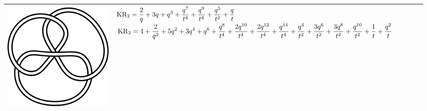 \documentclass{compositio}
\theoremstyle{definition}
\numberwithin{equation}{section}
\begin{document}
{\begin{longtable}{p{}|p{}}
\includegraphics[scale=0.07,angle=0]{link6_3_3.pdf} 
&
\newline 
$
\displaystyle{%
\KR_{2} = \frac{2}{q}+3 q+q^3+\frac{q^7}{t^4}+\frac{q^9}{t^4}+\frac{q^5}{t^2}+\frac{q}{t}
}
$
\newline 
$
\displaystyle{%
\KR_{3} = 4+\frac{2}{q^2}+5 q^2+3 q^4+q^6+\frac{q^8}{t^4}+\frac{2 q^{10}}{t^4}+\frac{2 q^{12}}{t^4}+\frac{q^{14}}{t^4}+\frac{q^4}{t^2}+\frac{3 q^6}{t^2}+\frac{3 q^8}{t^2}+\frac{q^{10}}{t^2}+\frac{1}{t}+\frac{q^2}{t}
}
$
\newline
\\
\hline
\end{longtable}
}
\end{document}

